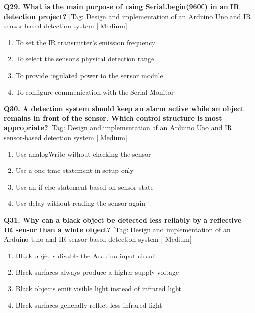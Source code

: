 \noindent\textbf{Q29. What is the main purpose of using Serial.begin(9600) in an IR detection project?} \hfill [Tag: Design and implementation of an Arduino Uno and IR sensor-based detection system | Medium]
\begin{enumerate}[label=(\alph*),topsep=2pt,itemsep=1pt,partopsep=0pt,parsep=0pt]
    \item {To set the IR transmitter's emission frequency}
    \item {To select the sensor's physical detection range}
    \item {To provide regulated power to the sensor module}
    \item {To configure communication with the Serial Monitor}
\end{enumerate}
\vspace{2mm}

\noindent\textbf{Q30. A detection system should keep an alarm active while an object remains in front of the sensor. Which control structure is most appropriate?} \hfill [Tag: Design and implementation of an Arduino Uno and IR sensor-based detection system | Medium]
\begin{enumerate}[label=(\alph*),topsep=2pt,itemsep=1pt,partopsep=0pt,parsep=0pt]
    \item {Use analogWrite without checking the sensor}
    \item {Use a one-time statement in setup only}
    \item {Use an if-else statement based on sensor state}
    \item {Use delay without reading the sensor again}
\end{enumerate}
\vspace{2mm}

\noindent\textbf{Q31. Why can a black object be detected less reliably by a reflective IR sensor than a white object?} \hfill [Tag: Design and implementation of an Arduino Uno and IR sensor-based detection system | Medium]
\begin{enumerate}[label=(\alph*),topsep=2pt,itemsep=1pt,partopsep=0pt,parsep=0pt]
    \item {Black objects disable the Arduino input circuit}
    \item {Black surfaces always produce a higher supply voltage}
    \item {Black objects emit visible light instead of infrared light}
    \item {Black surfaces generally reflect less infrared light}
\end{enumerate}
\vspace{2mm}

